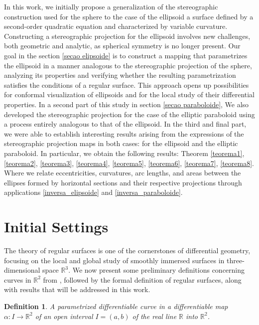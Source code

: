 \documentclass{amsart}
\theoremstyle{plain}
\newtheorem{definition}{\bf Definition}
\numberwithin{equation}{section}
\begin{document}
	In this work, we initially propose a generalization of the stereographic construction used for the sphere to the case of the ellipsoid a surface defined by a second-order quadratic equation and characterized by variable curvature. Constructing a stereographic projection for the ellipsoid involves new challenges, both geometric and analytic, as spherical symmetry is no longer present. Our goal in the section \ref{secao elipsoide} is to construct a mapping that parametrizes the ellipsoid in a manner analogous to the stereographic projection of the sphere, analyzing its properties and verifying whether the resulting parametrization satisfies the conditions of a regular surface. This approach opens up possibilities for conformal visualization of ellipsoids and for the local study of their differential properties. In a second part of this study in section \ref{secao paraboloide}, We also developed the stereographic projection for the case of the elliptic paraboloid using a process entirely analogous to that of the ellipsoid. In the third and final part, we were able to establish interesting results arising from the expressions of the stereographic projection maps in both cases: for the ellipsoid and the elliptic paraboloid. In particular, we obtain the following results: Theorem \ref{teorema1}, \ref{teorema2}, \ref{teorema3}, \ref{teorema4}, \ref{teorema5}, \ref{teorema6}, \ref{teorema7}, \ref{teorema8}. Where we relate eccentricities, curvatures, arc lengths, and areas between the ellipses formed by horizontal sections and their respective projections through applications \eqref{inversa_elipsoide} and \eqref{inversa_paraboloide}.
	
\section{Initial Settings}\label{section2}

The theory of regular surfaces is one of the cornerstones of differential geometry, focusing on the local and global study of smoothly immersed surfaces in three-dimensional space $\mathbb{R}^3$. We now present some preliminary definitions concerning curves in $\mathbb{R}^2$ from \cite{docarmo}, followed by the formal definition of regular surfaces, along with results that will be addressed in this work.

\vspace{0.3cm}


\begin{definition}
	A parametrized differentiable curve in a differentiable map $\alpha: I \rightarrow \mathbb{R}^2$ of an open interval $I=(a,b)$ of the real line $\mathbb{R}$ into $\mathbb{R}^2$.
\end{definition}
\end{document}
